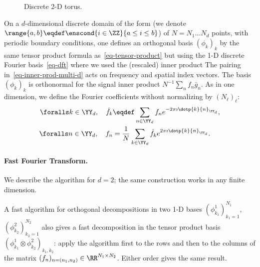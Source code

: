 \begin{figure}[tbp]
\centering
{}
\caption{Discrete 2-D torus.}
\label{fig-review-fourier-torus-discrete}
\end{figure}
On a $d$-dimensional discrete domain of the form
(we denote $\range{a,b} \eqdef \enscond{i \in \ZZ}{a \leq i \leq b}$)
of $N=N_1\ldots N_d$ points, with periodic boundary conditions, one defines an orthogonal basis $(\phi_k)_k$ by the same tensor product formula as~\eqref{eq-tensor-product} but using the 1-D discrete Fourier basis~\eqref{eq-dft}
where we used the (rescaled) inner product
The pairing in~\eqref{eq-inner-prod-multi-d} acts on frequency and spatial index vectors. The basis $(\phi_k)_k$ is orthonormal for the signal inner product $N^{-1}\sum_n f_n\bar g_n$. As in one dimension, we define the Fourier coefficients without normalizing by $(N_\ell)_\ell$:
\begin{align*}
	\foralls k \in \YY_d, \quad 
	\hat f_k &\eqdef \sum_{n \in \YY_d} f_n e^{-2\pi\imath\dotp{k}{n}_{\YY_d}}, \\
	\foralls n \in \YY_d, \quad 
	f_n &= \frac{1}{N} \sum_{k \in \YY_d} \hat f_k e^{2\pi\imath\dotp{k}{n}_{\YY_d}}.
\end{align*}



    
\paragraph{Fast Fourier Transform.}

We describe the algorithm for $d=2$; the same construction works in any finite dimension.
 
A fast algorithm for orthogonal decompositions in two 1-D bases $(\phi_{k_1}^{1})_{k_1=1}^{N_1}$, $(\phi_{k_2}^{2})_{k_2=1}^{N_2}$ also gives a fast decomposition in the tensor product basis
$(\phi_{k_1}^{1} \otimes \phi_{k_2}^{2})_{k_1,k_2}$: apply the algorithm first to the rows and then to the columns of the matrix $(f_n)_{n=(n_1,n_2)} \in \RR^{N_1 \times N_2}$. Either order gives the same result.
 
